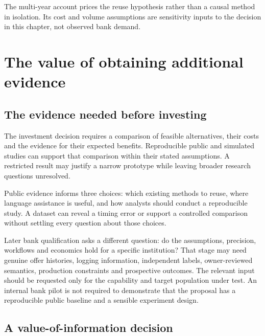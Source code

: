 The multi-year account prices the reuse hypothesis rather than a causal
method in isolation. Its cost and volume assumptions are sensitivity inputs
to the decision in this chapter, not observed bank demand.


\hypertarget{pd15:investment}{%
\section{The value of obtaining additional evidence}\label{pd15:investment}}

\hypertarget{proposal-acceptance-and-later-qualification}{%
\subsection{The evidence needed before investing}\label{proposal-acceptance-and-later-qualification}}

The investment decision requires a comparison of feasible alternatives,
their costs and the evidence for their expected benefits. Reproducible
public and simulated studies can support that comparison within their
stated assumptions. A restricted result may justify a narrow prototype
while leaving broader research questions unresolved.

Public evidence informs three choices: which existing methods to reuse,
where language assistance is useful, and how analysts should conduct a
reproducible study. A dataset can reveal a timing error or support a
controlled comparison without settling every question about those choices.

Later bank qualification asks a different question: do the assumptions,
precision, workflows and economics hold for a specific institution? That
stage may need genuine offer histories, logging information, independent
labels, owner-reviewed semantics, production constraints and prospective
outcomes. The relevant input should be requested only for the capability
and target population under test. An internal bank pilot is not required
to demonstrate that the proposal has a reproducible public baseline and
a sensible experiment design.

\hypertarget{a-value-of-information-decision}{%
\subsection{A value-of-information
decision}\label{a-value-of-information-decision}}

